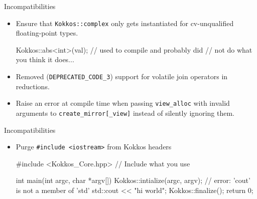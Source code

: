 \begin{frame}[fragile]{Incompatibilities}
\begin{itemize}
\item Ensure that \texttt{Kokkos::complex} only gets instantiated for
      cv-unqualified floating-point types.
\begin{code}
Kokkos::abs<int>(val);  // used to compile and probably did
                        // not do what you think it does...
\end{code}
\item Removed (\texttt{DEPRECATED\_CODE\_3}) support for volatile join
      operators in reductions.
\item Raise an error at compile time when passing \texttt{view\_alloc} with
      invalid arguments to \texttt{create\_mirror[\_view]} instead of silently
      ignoring them.
\end{itemize}
\end{frame}

\begin{frame}[fragile]{Incompatibilities}
\begin{itemize}
\item Purge \texttt{\#include <iostream>} from Kokkos headers
\begin{code}
#include <Kokkos_Core.hpp>
// Include what you use

int main(int argc, char *argv[])
{
  Kokkos::intialize(argc, argv);
  // error: 'cout' is not a member of 'std'
  std::cout << "hi world\n";
  Kokkos::finalize();
  return 0;
}
\end{code}
\end{itemize}
\end{frame}


